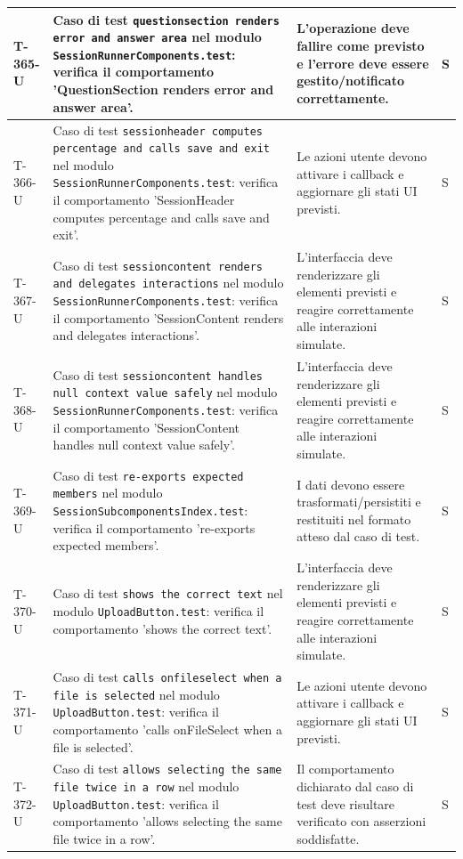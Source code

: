 \documentclass[a4paper,12pt]{article}
\begin{document}
{{\begin{longtable}{|>{\RaggedRight\arraybackslash}p{1.55cm}|>{\RaggedRight\arraybackslash}p{8.0cm}|>{\RaggedRight\arraybackslash}p{4.6cm}|>{\RaggedRight\arraybackslash}p{1.2cm}|}
        \hline
        T-365-U & Caso di test \texttt{questionsection renders error and answer area} nel modulo \texttt{SessionRunnerComponents.test}: verifica il comportamento 'QuestionSection renders error and answer area'. & L'operazione deve fallire come previsto e l'errore deve essere gestito/notificato correttamente. & S \\
        \hline
        T-366-U & Caso di test \texttt{sessionheader computes percentage and calls save and exit} nel modulo \texttt{SessionRunnerComponents.test}: verifica il comportamento 'SessionHeader computes percentage and calls save and exit'. & Le azioni utente devono attivare i callback e aggiornare gli stati UI previsti. & S \\
        \hline
        T-367-U & Caso di test \texttt{sessioncontent renders and delegates interactions} nel modulo \texttt{SessionRunnerComponents.test}: verifica il comportamento 'SessionContent renders and delegates interactions'. & L'interfaccia deve renderizzare gli elementi previsti e reagire correttamente alle interazioni simulate. & S \\
        \hline
        T-368-U & Caso di test \texttt{sessioncontent handles null context value safely} nel modulo \texttt{SessionRunnerComponents.test}: verifica il comportamento 'SessionContent handles null context value safely'. & L'interfaccia deve renderizzare gli elementi previsti e reagire correttamente alle interazioni simulate. & S \\
        \hline
        T-369-U & Caso di test \texttt{re-exports expected members} nel modulo \texttt{SessionSubcomponentsIndex.test}: verifica il comportamento 're-exports expected members'. & I dati devono essere trasformati/persistiti e restituiti nel formato atteso dal caso di test. & S \\
        \hline
        T-370-U & Caso di test \texttt{shows the correct text} nel modulo \texttt{UploadButton.test}: verifica il comportamento 'shows the correct text'. & L'interfaccia deve renderizzare gli elementi previsti e reagire correttamente alle interazioni simulate. & S \\
        \hline
        T-371-U & Caso di test \texttt{calls onfileselect when a file is selected} nel modulo \texttt{UploadButton.test}: verifica il comportamento 'calls onFileSelect when a file is selected'. & Le azioni utente devono attivare i callback e aggiornare gli stati UI previsti. & S \\
        \hline
        T-372-U & Caso di test \texttt{allows selecting the same file twice in a row} nel modulo \texttt{UploadButton.test}: verifica il comportamento 'allows selecting the same file twice in a row'. & Il comportamento dichiarato dal caso di test deve risultare verificato con asserzioni soddisfatte. & S \\

\end{longtable}}}
\end{document}
